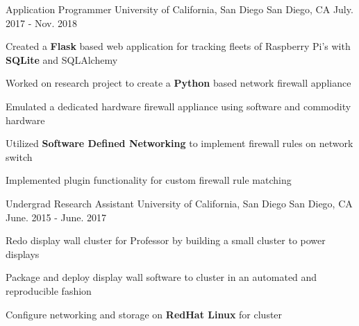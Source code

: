 \begin{cventries}
  \cventry
    {Application Programmer} %
    {\color{ucsandiegoblue}University of California, San Diego} %
    {San Diego, CA} %
    {July. 2017 - Nov. 2018} %
    {
      \begin{cvitems} %
        \item{ Created a \textbf{Flask} based web application for tracking fleets of Raspberry Pi's with \textbf{SQLite} and SQLAlchemy}
        \item{ Worked on research project to create a \textbf{Python} based network firewall appliance }
        \item{ Emulated a dedicated hardware firewall appliance using software and commodity hardware }
        \item {Utilized \textbf{Software Defined Networking} to implement firewall rules on network switch }
        \item { Implemented plugin functionality for custom firewall rule matching }
      \end{cvitems}
    }

  \cventry
    {Undergrad Research Assistant} %
    {\color{ucsandiegoblue}University of California, San Diego} %
    {San Diego, CA} %
    {June. 2015 - June. 2017} %
    {
      \begin{cvitems} %
        \item{ Redo display wall cluster for Professor by building a small cluster to power displays }
        \item{ Package and deploy display wall software to cluster in an automated and reproducible fashion}
        \item{ Configure networking and storage on \textbf{RedHat Linux} for cluster }
      \end{cvitems}
    }


\end{cventries}

